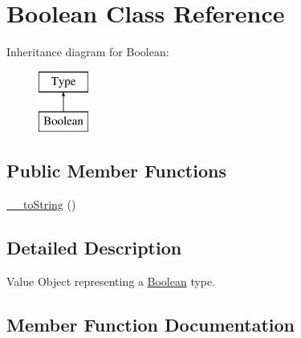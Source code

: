 \hypertarget{classphp_documentor_1_1_reflection_1_1_types_1_1_boolean}{}\section{Boolean Class Reference}
\label{classphp_documentor_1_1_reflection_1_1_types_1_1_boolean}
Inheritance diagram for Boolean\+:\begin{figure}[H]
\begin{center}
\leavevmode
\includegraphics[height=2.000000cm]{classphp_documentor_1_1_reflection_1_1_types_1_1_boolean}
\end{center}
\end{figure}
\subsection*{Public Member Functions}
\begin{DoxyCompactItemize}
\item 
\mbox{\hyperlink{classphp_documentor_1_1_reflection_1_1_types_1_1_boolean_a7516ca30af0db3cdbf9a7739b48ce91d}{\+\_\+\+\_\+to\+String}} ()
\end{DoxyCompactItemize}


\subsection{Detailed Description}
Value Object representing a \mbox{\hyperlink{classphp_documentor_1_1_reflection_1_1_types_1_1_boolean}{Boolean}} type. 

\subsection{Member Function Documentation}
\mbox{\label{classphp_documentor_1_1_reflection_1_1_types_1_1_boolean_a7516ca30af0db3cdbf9a7739b48ce91d}} 
